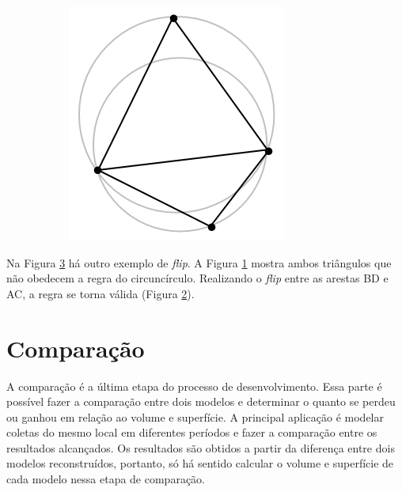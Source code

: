 \begin{figure}[H]
\begin{subfigure}[t]{0.27\textwidth}
        \caption{}
        \label{fig:delaunay_theorem2}
    \end{subfigure}
    \hspace{2em}
    \begin{subfigure}[t]{0.2\textwidth}
        \includegraphics[width=\textwidth]{dados/figuras/delaunay_theorem3.png}
        \caption{}
        \label{fig:delaunay_theorem3}
    \end{subfigure}
    \label{fig:delaunay_theorem}
\end{figure}

Na Figura \ref{fig:delaunay_theorem} há outro exemplo de \textit{flip}. A Figura \ref{fig:delaunay_theorem2} mostra ambos triângulos que não obedecem a regra do circuncírculo. Realizando o \textit{flip} entre as arestas BD e AC, a regra se torna válida (Figura \ref{fig:delaunay_theorem3}). 

\section{Comparação}
\label{sec:comparacao}

A comparação é a última etapa do processo de desenvolvimento. 
Essa parte é possível fazer a comparação entre dois modelos e determinar o quanto se perdeu ou ganhou em relação ao volume e superfície. 
A principal aplicação é modelar coletas do mesmo local em diferentes períodos e fazer a comparação entre os resultados alcançados. 
Os resultados são obtidos a partir da diferença entre dois modelos reconstruídos, portanto, só há sentido calcular o volume e superfície de cada modelo nessa etapa de comparação.

